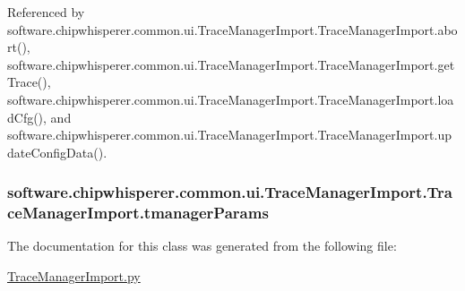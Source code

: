 Referenced by software.\+chipwhisperer.\+common.\+ui.\+Trace\+Manager\+Import.\+Trace\+Manager\+Import.\+abort(), software.\+chipwhisperer.\+common.\+ui.\+Trace\+Manager\+Import.\+Trace\+Manager\+Import.\+get\+Trace(), software.\+chipwhisperer.\+common.\+ui.\+Trace\+Manager\+Import.\+Trace\+Manager\+Import.\+load\+Cfg(), and software.\+chipwhisperer.\+common.\+ui.\+Trace\+Manager\+Import.\+Trace\+Manager\+Import.\+update\+Config\+Data().

\hypertarget{classsoftware_1_1chipwhisperer_1_1common_1_1ui_1_1TraceManagerImport_1_1TraceManagerImport_ac667ae7eb9674002477bf0d6df4a64de}{}
\subsubsection[{tmanager\+Params}]{\setlength{\rightskip}{0pt plus 5cm}software.\+chipwhisperer.\+common.\+ui.\+Trace\+Manager\+Import.\+Trace\+Manager\+Import.\+tmanager\+Params}\label{classsoftware_1_1chipwhisperer_1_1common_1_1ui_1_1TraceManagerImport_1_1TraceManagerImport_ac667ae7eb9674002477bf0d6df4a64de}


The documentation for this class was generated from the following file\+:\begin{DoxyCompactItemize}
\item 
\hyperlink{TraceManagerImport_8py}{Trace\+Manager\+Import.\+py}\end{DoxyCompactItemize}
